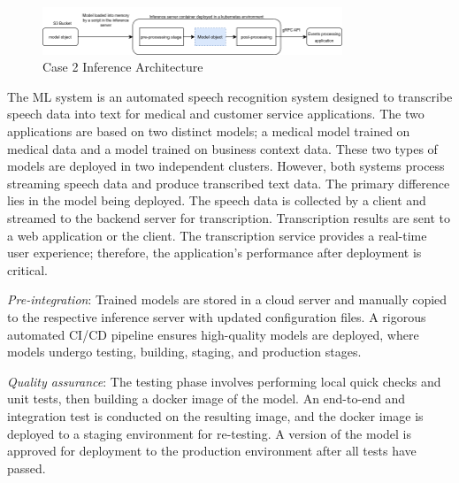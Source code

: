 
\begin{figure}[t]
\centering
\includegraphics[width=0.8\textwidth]{images/case2_deployment_process_v2.png}
\caption{Case 2 Inference Architecture}
\label{fig: case2_deployment_process}
\end{figure}

The ML system is an automated speech recognition system designed to transcribe speech data into text for medical and customer service applications. The two applications are based on two distinct models; a medical model trained on medical data and a model trained on business context data. These two types of models are deployed in two independent clusters. However, both systems process streaming speech data and produce transcribed text data. The primary difference lies in the model being deployed. The speech data is collected by a client and streamed to the backend server for transcription. Transcription results are sent to a web application or the client. The transcription service provides a real-time user experience; therefore, the application's performance after deployment is critical.

\textit{Pre-integration}: Trained models are stored in a cloud server and manually copied to the respective inference server with updated configuration files. A rigorous automated CI/CD pipeline ensures high-quality models are deployed, where models undergo testing, building, staging, and production stages. 

\textit{Quality assurance}: The testing phase involves performing local quick checks and unit tests, then building a docker image of the model. An end-to-end and integration test is conducted on the resulting image, and the docker image is deployed to a staging environment for re-testing. A version of the model is approved for deployment to the production environment after all tests have passed. 

